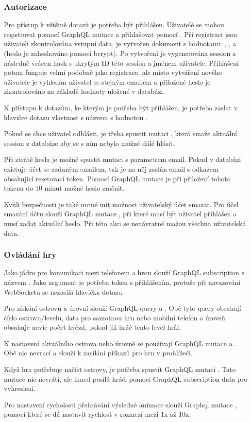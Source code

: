 \subsubsection{Autorizace}
Pro přístup k většině dotazů je potřeba být přihlášen. Uživatelé se mohou registrovat pomocí GraphQL mutace  a přihlašovat pomocí . Při registraci jsou uživateli zkontrolována vstupní data, je vytvořen dokument s hodnotami: , ,  a  (heslo je zaheshováno pomocí bcrypt\cite{bcrypt}). Po vytvoření je vygenerována session a následně vrácen hash s ukrytým ID této session a jménem uživatele. Přihlášení potom funguje velmi podobně jako registrace, ale místo vytváření nového uživatele je vyhledán uživatel se stejným emailem a přiložené heslo je zkontrolováno na základě hodnoty uložené v databázi.\par
K přístupu k dotazům, ke kterým je potřeba být přihlášen, je potřeba zaslat v hlavičce dotazu vlastnost s názvem  s hodnotou .\par
Pokud se chce uživatel odhlásit, je třeba spustit mutaci , která smaže aktuální session z databáze aby se s ním nebylo možné dálé hlásit.\par
Při ztrátě hesla je možné spustit mutaci  s parametrem email. Pokud v databázi existuje účet se zadaným emailem, tak je na něj zaslán email s odkazem obsahující resetovací token. Pomocí GraphQL mutace  je při přiložení tohoto tokenu do 10 minut možné heslo změnit.\par
Kvůli bezpečnosti je také nutné mít možnost uživatelský účet smazat. Pro účel smazání účtu slouží GraphQL mutace , při které musí být uživatel přihlášen a musí zadat aktuální heslo. Při této akci se nenávratně mažou všechna uživatelská data.

\subsubsection{Ovládání hry}
Jako jádro pro komunikaci mezi telefonem a hrou slouží GraphQL subscription s názvem . Jako argument je potřeba token s přihlášením, protože při navazování WebSocketu se nezasílá hlavička dotazu.\par
Pro získání ostrovů a úrovní slouží GraphQL query  a . Obě tyto query obsahují číslo ostrovu/levelu, data pro samotnou hru nebo mobilní telefon a úroveň obsahuje navíc počet hvězd, pokud již hráč tento level hrál.\par
K nastavení aktuálního ostrova nebo úrovně se používají GraphQL mutace  a . Obě nic nevrací a slouží k zasílání příkazů pro hru v prohlížeči.\par
Když hra potřebuje načíst ostrovy, je potřeba spustit GraphQL mutaci . Tato mutace nic nevrátí, ale ihned posílá hráči pomocí GraphQL subscription data pro vykreslení.\par
Pro nastavení rycholosti přehrávání výsledné animace slouží Graphql mutace , pomocí které se dá nastavit rychlost v rozmezí mezi 1x až 10x.

